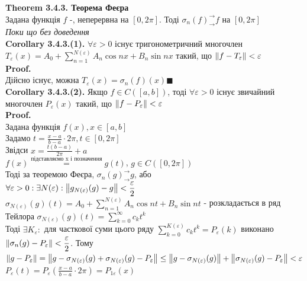 \documentclass{math_library}
\begin{document}
\textbf{Theorem 3.4.3. Теорема Феєра}\\
Задана функція $f$ -, неперервна на $[0, 2\pi]$. Тоді $\sigma_n(f) ^\rightarrow_\rightarrow f$ на $[0,2\pi]$\\
\textit{Поки що без доведення}
\bigskip \\
\textbf{Corollary 3.4.3.(1).} $\forall \varepsilon>0$ існує тригонометричний многочлен $\displaystyle T_\varepsilon(x) = A_0 + \sum_{n=1}^{N(\varepsilon)} A_n \cos nx + B_n \sin nx$ такий, що $\norm{f - T_{\varepsilon}}<\varepsilon$\\
\textbf{Proof.}\\
Дійсно існує, можна $T_{\varepsilon}(x) = \sigma_n(f)(x) \blacksquare$
\bigskip \\
\textbf{Corollary 3.4.3.(2).} Якщо $f \in C([a,b])$, тоді $\forall \varepsilon>0$ існує звичайний многочлен $\displaystyle P_{\varepsilon}(x)$ такий, що $\norm{f-P_{\varepsilon}}<\varepsilon$\\
\textbf{Proof.}\\
Задана функція $f(x), x \in [a,b]$\\
Задамо $\displaystyle t = \frac{x-a}{b-a} \cdot 2\pi, t \in [0, 2\pi]$\\
Звідси $\displaystyle x = \frac{t(b-a)}{2\pi}+a$\\
$\displaystyle f(x) \overset{\textrm{підставляємо x і позначення}}{=} g(t)$, $g \in C([0,2\pi])$\\
Тоді за теоремою Феєра, $\sigma_n(g) ^\rightarrow_\rightarrow g$, або\\
$\displaystyle \forall \varepsilon > 0: \exists N(\varepsilon): \norm{g_{N(\varepsilon)}(g) -g} < \frac{\varepsilon}{2}$\\
$\displaystyle \sigma_{N(\varepsilon)}(g)(t) = A_0 + \sum_{n=1}^{N(\varepsilon)} A_n \cos nt + B_n \sin nt$ - розкладається в ряд Тейлора
$\displaystyle \sigma_{N(\varepsilon)}(g)(t) = \sum_{k=0}^{\infty} c_k t^k$\\
Тоді $\exists K_{\varepsilon}:$ для часткової суми цього ряду $\displaystyle \sum_{k=0}^{K(\varepsilon)} c_k t^k = P_{\varepsilon}(k)$ виконано $\displaystyle \norm{\sigma_n(g) - P_{\varepsilon}} < \frac{\varepsilon}{2}$. Тому\\
$\norm{g-P_{\varepsilon}} = \norm{g - \sigma_{N(\varepsilon)}(g) + \sigma_{N(\varepsilon)}(g) - P_{\varepsilon}} \leq \norm{g - \sigma_{N(\varepsilon)}(g)} + \norm{\sigma_{N(\varepsilon)}(g) - P_{\varepsilon}} < \varepsilon$\\
$\displaystyle P_{\varepsilon}(t) = P_{\varepsilon}(\frac{x-a}{b-a} \cdot 2\pi) = P_{1\varepsilon}(x)$\\
\end{document}
